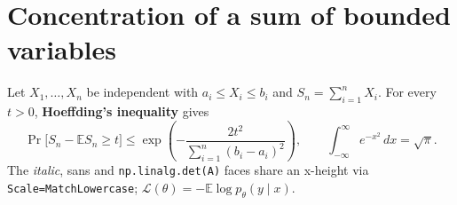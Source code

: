 \documentclass{article}
\begin{document}
\section{Concentration of a sum of bounded variables}
Let $X_1,\dots,X_n$ be independent with $a_i \le X_i \le b_i$ and $S_n = \sum_{i=1}^n X_i$.
For every $t > 0$, \textbf{Hoeffding's inequality} gives
\[
	\Pr\bigl[S_n - \mathbb{E} S_n \ge t\bigr]
	\le \exp\!\left(-\frac{2t^2}{\sum_{i=1}^n (b_i - a_i)^2}\right),
	\qquad
	\int_{-\infty}^{\infty} e^{-x^2}\,dx = \sqrt{\pi}.
\]
The \textit{italic}, \textsf{sans} and \texttt{np.linalg.det(A)} faces share an x-height
via \texttt{Scale=MatchLowercase}; $\mathcal{L}(\theta) = -\mathbb{E}\log p_\theta(y \mid x)$.
\end{document}
